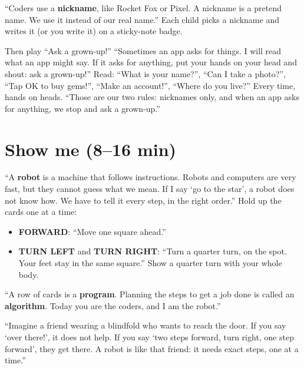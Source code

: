 \begin{safety}
\enquote{Coders use a \textbf{nickname}, like Rocket Fox or Pixel. A nickname is a pretend name. We use it instead of our real name.} Each child picks a nickname and writes it (or you write it) on a sticky-note badge.

Then play \enquote{Ask a grown-up!} \enquote{Sometimes an app asks for things. I will read what an app might say. If it asks for anything, put your hands on your head and shout: ask a grown-up!} Read: \enquote{What is your name?}, \enquote{Can I take a photo?}, \enquote{Tap OK to buy gems!}, \enquote{Make an account!}, \enquote{Where do you live?} Every time, hands on heads. \enquote{Those are our two rules: nicknames only, and when an app asks for anything, we stop and ask a grown-up.}
\end{safety}

\section{Show me (8--16 min)}
\begin{teacherscript}
\enquote{A \textbf{robot} is a machine that follows instructions. Robots and computers are very fast, but they cannot guess what we mean. If I say \enquote{go to the star}, a robot does not know how. We have to tell it every step, in the right order.} Hold up the cards one at a time:
\begin{itemize}[leftmargin=1.2em,itemsep=1pt]
  \item \textbf{FORWARD}: \enquote{Move one square ahead.}
  \item \textbf{TURN LEFT} and \textbf{TURN RIGHT}: \enquote{Turn a quarter turn, on the spot. Your feet stay in the same square.} Show a quarter turn with your whole body.
\end{itemize}
\enquote{A row of cards is a \textbf{program}. Planning the steps to get a job done is called an \textbf{algorithm}. Today you are the coders, and I am the robot.}
\end{teacherscript}

\begin{analogy}
\enquote{Imagine a friend wearing a blindfold who wants to reach the door. If you say \enquote{over there!}, it does not help. If you say \enquote{two steps forward, turn right, one step forward}, they get there. A robot is like that friend: it needs exact steps, one at a time.}
\end{analogy}

